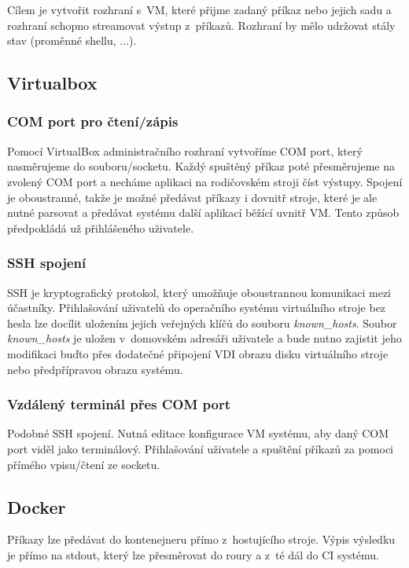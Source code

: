 Cílem je vytvořit rozhraní s~VM, které přijme zadaný příkaz nebo jejich sadu a rozhraní schopno streamovat výstup z~příkazů.
Rozhraní by mělo udržovat stály stav (proměnné shellu, ...).

\subsection{Virtualbox}

\subsubsection{COM port pro čtení/zápis}

Pomocí VirtualBox administračního rozhraní vytvoříme COM port, který nasměrujeme do souboru/socketu.
Každý spuštěný příkaz poté přesměrujeme na zvolený COM port a necháme aplikaci na rodičovském stroji číst výstupy.
Spojení je oboustranné, takže je možné předávat příkazy i dovnitř stroje, které je ale nutné parsovat a předávat systému další aplikací běžící uvnitř VM.
Tento způsob předpokládá už přihlášeného uživatele.

\subsubsection{SSH spojení}

SSH je kryptografický protokol, který umožňuje oboustrannou komunikaci mezi účastníky.
Přihlašování uživatelů do operačního systému virtuálního stroje bez hesla lze docílit uložením jejich veřejných klíčů do souboru \textit{known\_hosts}.
Soubor \textit{known\_hosts} je uložen v~domovském adresáři uživatele a bude nutno zajistit jeho modifikaci buďto přes dodatečné připojení VDI obrazu disku virtuálního stroje nebo předpřípravou obrazu systému.

\subsubsection{Vzdálený terminál přes COM port}

Podobné SSH spojení.
Nutná editace konfigurace VM systému, aby daný COM port viděl jako terminálový.
Přihlašování uživatele a spuštění příkazů za pomoci přímého vpisu/čtení ze socketu.

\subsection{Docker}

Příkazy lze předávat do kontenejneru přímo z~hostujícího stroje.
Výpis výsledku je přímo na stdout, který lze přesměrovat do roury a z~té dál do CI systému.

